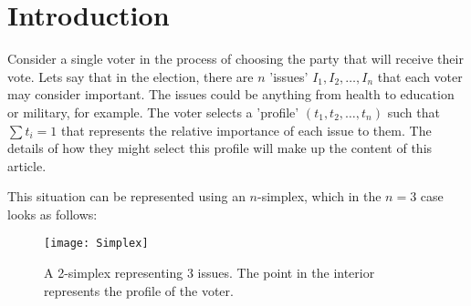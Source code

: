 \documentclass[
10pt, %
a4paper, %
oneside, %
headinclude,footinclude, %
BCOR5mm, %
]{scrartcl}
\theoremstyle{definition} %
\theoremstyle{plain} %
\theoremstyle{remark} %
\begin{document}

{\let\thefootnote\relax{}}



\newpage %


\section{Introduction}

Consider a single voter in the process of choosing the party that will receive their vote. Lets say that in the election, there are $n$ 'issues' $I_1,I_2,\ldots,I_n$ that each voter may consider important. The issues could be anything from health to education or military, for example. The voter selects a 'profile' $(t_1,t_2,\ldots,t_n)$ such that $\sum{t_i}=1$ that represents the relative importance of each issue to them. The details of how they might select this profile will make up the content of this article.

This situation can be represented using an $n$-simplex, which in the $n=3$ case looks as follows:

\begin{figure}[h]
\centering 
\texttt{[image: Simplex]} 
\caption[A 2-simplex representing 3 issues]{A 2-simplex representing 3 issues. The point in the interior represents the profile of the voter.} %
\label{fig:simplex} 
\end{figure}
\end{document}
